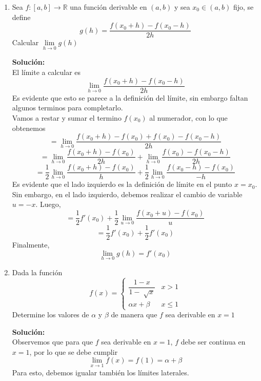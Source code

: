 \documentclass[12pt]{article}
\newenvironment{solucion}
{\begin{mdframed}[backgroundcolor=black!10]
		{\bf Solución:}\\
	}
	{
	\end{mdframed}
}
\newenvironment{preguntas}
{\begin{enumerate}\itemsep12pt
	}
	{
	\end{enumerate}
}
\newcommand{\ra}{\rightarrow}
\newcommand{\R}{\mathbb{R}}
\begin{document}
\begin{preguntas}
\begin{solucion}
\begin{enumerate}[a)]
\item $$f'(x) = \lim\limits_{h \ra 0} \dfrac{(x+h+5) - (x+5)}{h} =
 \lim\limits_{h \ra 0} \dfrac{x+h+5 -x-5}{h} =
 \lim\limits_{h \ra 0} \dfrac{h}{h} = 1$$
\item \small$$f'(x) = \lim\limits_{h \ra 0} \dfrac{(2(x+h)^2-3) - (2x^2-3)}{h} =
\lim\limits_{h \ra 0} \dfrac{2(x^2+2xh+h^2)-3-2x^2+3}{h}$$
$$=
\lim\limits_{h \ra 0} \dfrac{2x^2+4xh+2h^2 - 3 -2x^2+3}{h} =
\lim\limits_{h \ra 0} \dfrac{h(4x+2h)}{h} = 
\lim\limits_{h \ra 0} 4x+2h =
4x$$
\end{enumerate}
\end{solucion}
\item Sea $f:[a,b] \ra \R$ una función derivable en $(a,b)$ y sea $x_0 \in (a,b)$ fijo, se define
$$ g(h) = \dfrac{f(x_0 + h) - f(x_0-h)}{2h}$$
Calcular $\lim\limits_{h \ra 0} g(h)$
\begin{solucion}
El límite a calcular es
$$ \lim\limits_{h \ra 0} \dfrac{f(x_0 + h) - f(x_0-h)}{2h}$$
Es evidente que esto se parece a la definición del límite, sin embargo faltan algunos terminos para completarlo.\\
Vamos a restar y sumar el termino $f(x_0)$ al numerador, con lo que obtenemos
$$= \lim\limits_{h \ra 0} \dfrac{f(x_0 + h) - f(x_0) + f(x_0) - f(x_0-h)}{2h}$$
$$= \lim\limits_{h \ra 0} \dfrac{f(x_0 + h) - f(x_0)}{2h} + \lim\limits_{h \ra 0} \dfrac{f(x_0) - f(x_0-h)}{2h}$$
$$= \dfrac{1}{2}\lim\limits_{h \ra 0} \dfrac{f(x_0 + h) - f(x_0)}{h} + \dfrac{1}{2}\lim\limits_{h \ra 0} \dfrac{f(x_0-h) - f(x_0)}{-h}$$
Es evidente que el lado izquierdo es la definición de límite en el punto $x=x_0$. Sin embargo, en el lado izquierdo, debemos realizar el cambio de variable $u = -x$. Luego,
$$= \dfrac{1}{2}f'(x_0) + \dfrac{1}{2}\lim\limits_{u \ra 0} \dfrac{f(x_0+u) - f(x_0)}{u}$$
$$= \dfrac{1}{2}f'(x_0) + \dfrac{1}{2}f'(x_0)$$
Finalmente,
$$\lim\limits_{h \ra 0} g(h) = f'(x_0)$$
\end{solucion}
\item Dada la función
$$f(x) = \begin{cases}
\dfrac{1-x}{1-\sqrt[]{x}} & x > 1\\
\alpha x + \beta & x \leq 1
\end{cases}$$
Determine los valores de $\alpha$ y $\beta$ de manera que $f$ sea derivable en $x=1$
\begin{solucion}
Observemos que para que $f$ sea derivable en $x=1$, $f$ debe ser continua en $x=1$, por lo que se debe cumplir
$$\lim\limits_{x\ra 1}f(x) = f(1) = \alpha  + \beta$$
Para esto, debemos igualar también los límites laterales.

\end{solucion}
\end{preguntas}
\end{document}
